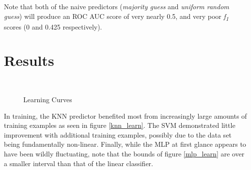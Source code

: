 \documentclass[10pt,conference]{IEEEtran}
\begin{document}
 Note that both of the naive predictors (\emph{majority guess} and \emph{uniform random guess}) will produce an ROC AUC score of very nearly 0.5, and very poor \emph{f\textsubscript{1}} scores (0 and 0.425 respectively).

\section{Results}

\begin{figure}
  \centering
   \\
  \caption{Learning Curves}
  \label{learning_curves}
\end{figure}

In training, the KNN predictor benefited most from increasingly large amounts of training examples as seen in figure \ref{knn_learn}. The SVM demonstrated little improvement with additional training examples, possibly due to the data set being fundamentally non-linear. Finally, while the MLP at first glance appears to have been wildly fluctuating, note that the bounds of figure \ref{mlp_learn} are over a smaller interval than that of the linear classifier.
\end{document}
